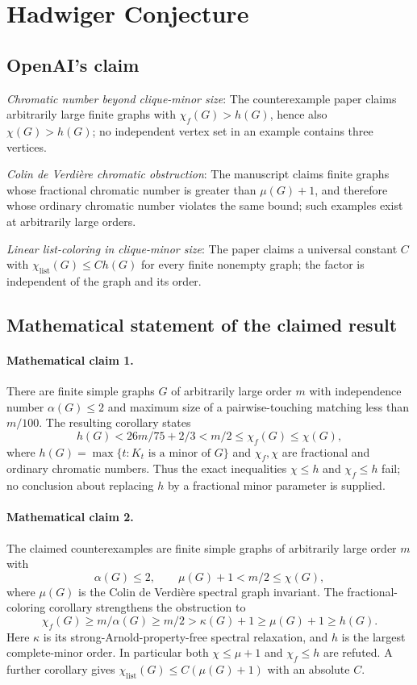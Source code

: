 \documentclass[11pt]{article}
\begin{document}
\section*{Hadwiger Conjecture}

\subsection{OpenAI's claim}
\textit{Chromatic number beyond clique-minor size}: The counterexample paper claims arbitrarily large finite graphs with $\chi_f(G)>h(G)$, hence also $\chi(G)>h(G)$; no independent vertex set in an example contains three vertices.

\textit{Colin de Verdière chromatic obstruction}: The manuscript claims finite graphs whose fractional chromatic number is greater than $\mu(G)+1$, and therefore whose ordinary chromatic number violates the same bound; such examples exist at arbitrarily large orders.

\textit{Linear list-coloring in clique-minor size}: The paper claims a universal constant $C$ with $\chi_{\mathrm{list}}(G)\le C h(G)$ for every finite nonempty graph; the factor is independent of the graph and its order.

\subsection{Mathematical statement of the claimed result}
\paragraph{Mathematical claim 1.} There are finite simple graphs $G$ of arbitrarily large order $m$ with independence number $\alpha(G)\le2$ and maximum size of a pairwise-touching matching less than $m/100$. The resulting corollary states \[h(G)<26m/75+2/3<m/2\le\chi_f(G)\le\chi(G),\] where $h(G)=\max\{t:K_t\text{ is a minor of }G\}$ and $\chi_f,\chi$ are fractional and ordinary chromatic numbers. Thus the exact inequalities $\chi\le h$ and $\chi_f\le h$ fail; no conclusion about replacing $h$ by a fractional minor parameter is supplied.

\paragraph{Mathematical claim 2.} The claimed counterexamples are finite simple graphs of arbitrarily large order $m$ with \[\alpha(G)\le2,\qquad\mu(G)+1<m/2\le\chi(G),\] where $\mu(G)$ is the Colin de Verdi\`ere spectral graph invariant. The fractional-coloring corollary strengthens the obstruction to \[\chi_f(G)\ge m/\alpha(G)\ge m/2>\kappa(G)+1\ge\mu(G)+1\ge h(G).\] Here $\kappa$ is its strong-Arnold-property-free spectral relaxation, and $h$ is the largest complete-minor order. In particular both $\chi\le\mu+1$ and $\chi_f\le h$ are refuted. A further corollary gives $\chi_{\mathrm{list}}(G)\le C(\mu(G)+1)$ with an absolute $C$.
\end{document}
